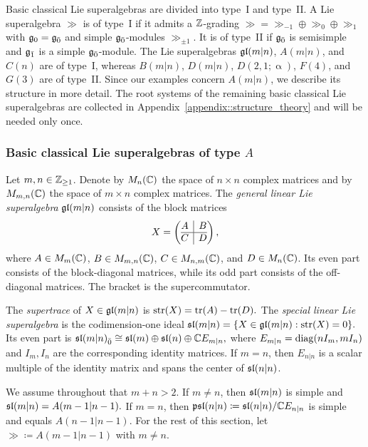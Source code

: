 Basic classical Lie superalgebras are divided into type~I and type~II. A Lie superalgebra $\gg$ is of type~I if it admits a $\ZZ$-grading
$
\gg=\gg_{-1}\oplus\gg_0\oplus\gg_1
$
with $\gg_0=\even$ and simple $\even$-modules $\gg_{\pm1}$. It is of type~II if $\even$ is semisimple and $\odd$ is a simple $\even$-module. The Lie superalgebras $\gl(m\vert n)$, $A(m\vert n)$, and $C(n)$ are of type~I, whereas $B(m\vert n)$, $D(m\vert n)$, $D(2,1;\upalpha)$, $F(4)$, and $G(3)$ are of type~II. 
Since our examples concern $A(m\vert n)$, we describe its structure in more detail. The root systems of the remaining basic classical Lie superalgebras are collected in Appendix~\ref{appendix::structure_theory} and will be needed only once.

\subsubsection{Basic classical Lie superalgebras of type \texorpdfstring{$A$}{A}}\label{subsec::type_A_structure}

Let $m,n\in\ZZ_{\geq1}$. Denote by $M_n(\CC)$ the space of $n\times n$ complex matrices and by $M_{m,n}(\CC)$ the space of $m\times n$ complex matrices. The \emph{general linear Lie superalgebra} $\glmn$ consists of the block matrices
\begin{equation}\label{eq::matrix_form}
X=\left(\begin{array}{@{}c|c@{}}
A&B\\ \hline
C&D
\end{array}\right),
\end{equation}
where $A\in M_m(\CC)$, $B\in M_{m,n}(\CC)$, $C\in M_{n,m}(\CC)$, and $D\in M_n(\CC)$. Its even part consists of the block-diagonal matrices, while its odd part consists of the off-diagonal matrices. The bracket is the supercommutator.

The \emph{supertrace} of $X\in\glmn$ is
$
\str(X)=\tr(A)-\tr(D).
$
The \emph{special linear Lie superalgebra} is the codimension-one ideal
$
\slmn=\{X\in\glmn:\str(X)=0\}.
$
Its even part is
$
\slmn_{\bar0}\cong\sl(m)\oplus\sl(n)\oplus\CC E_{m\vert n},
$
where $E_{m\vert n}=\diag(nI_m,mI_n)$ and $I_m,I_n$ are the corresponding identity matrices. If $m=n$, then $E_{n\vert n}$ is a scalar multiple of the identity matrix and spans the center of $\sl(n\vert n)$.

We assume throughout that $m+n>2$. If $m\neq n$, then $\slmn$ is simple and
$
\slmn=A(m-1\vert n-1).
$
If $m=n$, then
$
\mathfrak{psl}(n\vert n)\coloneqq\sl(n\vert n)/\CC E_{n\vert n}
$
is simple and equals $A(n-1\vert n-1)$. For the rest of this section, let $\gg\coloneqq A(m-1\vert n-1)$ with $m\neq n$.

